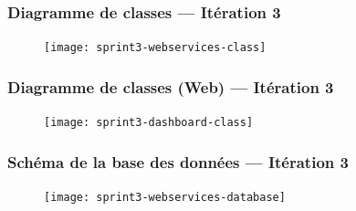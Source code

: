 \documentclass{beamer}
\begin{document}
\begin{frame}
    \frametitle{Diagramme de classes --- Itération 3}
    \begin{figure}
        \texttt{[image: sprint3-webservices-class]}
    \end{figure}
\end{frame}

\begin{frame}
    \frametitle{Diagramme de classes (Web) --- Itération 3}
    \begin{figure}
        \texttt{[image: sprint3-dashboard-class]}
    \end{figure}
\end{frame}

\begin{frame}
    \frametitle{Schéma de la base des données --- Itération 3}
    \begin{figure}
        \texttt{[image: sprint3-webservices-database]}
    \end{figure}
\end{frame}
\end{document}
